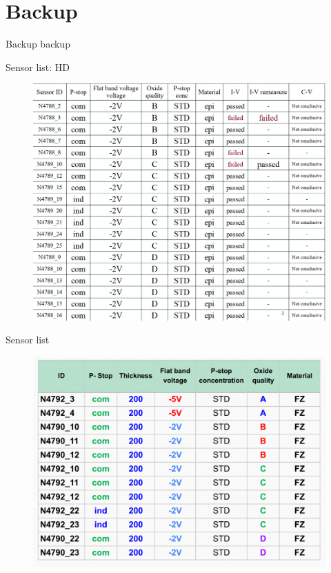 \documentclass{beamer}
\begin{document}
\section*{Backup}

\begin{frame}{Backup}
	\center
	\huge
	backup
\end{frame}

\begin{frame}{Sensor list: HD}
   \begin{figure}
       \includegraphics[width=.8\textwidth]{plots/PM8_sensorList.png}
   \end{figure} 
\end{frame}

\begin{frame}{Sensor list}
   \begin{figure}
       \includegraphics[width=.8\textwidth]{plots/winter2022_sensorList.png}
   \end{figure} 
\end{frame}
\end{document}
